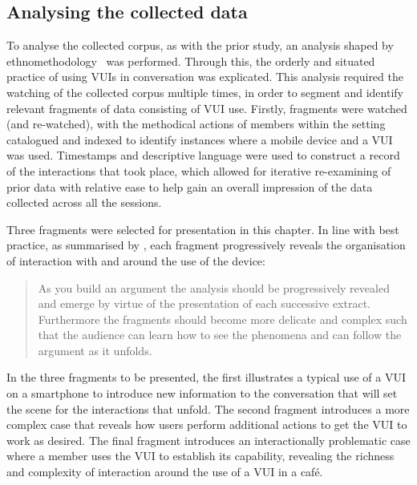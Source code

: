 \subsection{Analysing the collected data}\label{sec:empirical cafe design analysis}
\begin{revisedsubmission}
To analyse the collected corpus, as with the prior study, an analysis shaped by ethnomethodology~\citep{Garfinkel1967, Sacks1974} was performed.
Through this, the orderly and situated practice of using \acp{VUI} in conversation was explicated.
This analysis required the watching of the collected corpus multiple times, in order to segment and identify relevant fragments of data consisting of \ac{VUI} use.
Firstly, fragments were watched (and re-watched), with the methodical actions of members within the setting catalogued and indexed to identify instances where a mobile device and a \ac{VUI} was used.
Timestamps and descriptive language were used to construct a record of the interactions that took place, which allowed for iterative re-examining of prior data with relative ease to help gain an overall impression of the data collected across all the sessions.

Three fragments were selected for presentation in this chapter.
In line with best practice, as summarised by \citet{Heath2010}, each fragment progressively reveals the organisation of interaction with and around the use of the device:
\begin{quote}
    As you build an argument the analysis should be progressively revealed and emerge by virtue of the presentation of each successive extract. Furthermore the fragments should become more delicate and complex such that the audience can learn how to see the phenomena and can follow the argument as it unfolds.
\end{quote}
In the three fragments to be presented, the first illustrates a typical use of a \ac{VUI} on a smartphone to introduce new information to the conversation that will set the scene for the interactions that unfold.
The second fragment introduces a more complex case that reveals how users perform additional actions to get the \ac{VUI} to work as desired.
The final fragment introduces an interactionally problematic case where a member uses the \ac{VUI} to establish its capability, revealing the richness and complexity of interaction around the use of a \ac{VUI} in a caf\'{e}.


\end{revisedsubmission}
